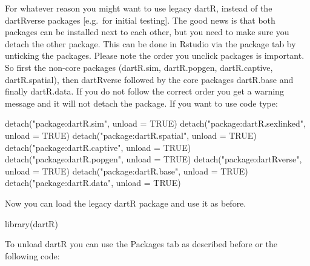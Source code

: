 \documentclass[
  letterpaper,
  DIV=11,
  numbers=noendperiod]{scrreprt}
\newenvironment{Shaded}{\begin{snugshade}}{\end{snugshade}}
\newcommand{\AttributeTok}[1]{\textcolor[rgb]{0.49,0.56,0.16}{#1}}
\newcommand{\ConstantTok}[1]{\textcolor[rgb]{0.53,0.00,0.00}{#1}}
\newcommand{\FunctionTok}[1]{\textcolor[rgb]{0.02,0.16,0.49}{#1}}
\newcommand{\NormalTok}[1]{\textcolor[rgb]{0.00,0.44,0.13}{#1}}
\newcommand{\StringTok}[1]{\textcolor[rgb]{0.25,0.44,0.63}{#1}}
\begin{document}

For whatever reason you might want to use legacy dartR, instead of the
dartRverse packages {[}e.g.~for initial testing{]}. The good news is
that both packages can be installed next to each other, but you need to
make sure you detach the other package. This can be done in Rstudio via
the package tab by unticking the packages. Please note the order you
unclick packages is important. So first the non-core packages
(dartR.sim, dartR.popgen, dartR.captive, dartR.spatial), then dartRverse
followed by the core packages dartR.base and finally dartR.data. If you
do not follow the correct order you get a warning message and it will
not detach the package. If you want to use code type:

\begin{Shaded}
\begin{Highlighting}[]
\FunctionTok{detach}\NormalTok{(}\StringTok{"package:dartR.sim"}\NormalTok{, }\AttributeTok{unload =} \ConstantTok{TRUE}\NormalTok{)}
\FunctionTok{detach}\NormalTok{(}\StringTok{"package:dartR.sexlinked"}\NormalTok{, }\AttributeTok{unload =} \ConstantTok{TRUE}\NormalTok{)}
\FunctionTok{detach}\NormalTok{(}\StringTok{"package:dartR.spatial"}\NormalTok{, }\AttributeTok{unload =} \ConstantTok{TRUE}\NormalTok{)}
\FunctionTok{detach}\NormalTok{(}\StringTok{"package:dartR.captive"}\NormalTok{, }\AttributeTok{unload =} \ConstantTok{TRUE}\NormalTok{)}
\FunctionTok{detach}\NormalTok{(}\StringTok{"package:dartR.popgen"}\NormalTok{, }\AttributeTok{unload =} \ConstantTok{TRUE}\NormalTok{)}
\FunctionTok{detach}\NormalTok{(}\StringTok{"package:dartRverse"}\NormalTok{, }\AttributeTok{unload =} \ConstantTok{TRUE}\NormalTok{)}
\FunctionTok{detach}\NormalTok{(}\StringTok{"package:dartR.base"}\NormalTok{, }\AttributeTok{unload =} \ConstantTok{TRUE}\NormalTok{)}
\FunctionTok{detach}\NormalTok{(}\StringTok{"package:dartR.data"}\NormalTok{, }\AttributeTok{unload =} \ConstantTok{TRUE}\NormalTok{)}
\end{Highlighting}
\end{Shaded}

Now you can load the legacy dartR package and use it as before.

\begin{Shaded}
\begin{Highlighting}[]
\FunctionTok{library}\NormalTok{(dartR)}
\end{Highlighting}
\end{Shaded}

To unload dartR you can use the Packages tab as described before or the
following code:
\end{document}
